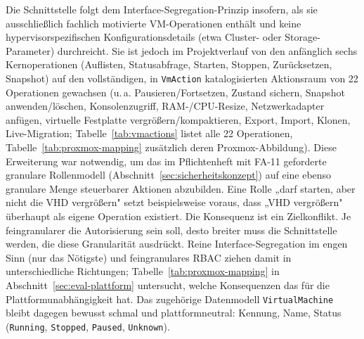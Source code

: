 \documentclass[12pt,a4paper]{article}
\begin{document}
Die Schnittstelle folgt dem Interface-Segregation-Prinzip insofern, als sie ausschließlich fachlich motivierte VM-Operationen enthält und keine hypervisorspezifischen Konfigurationsdetails (etwa Cluster- oder Storage-Parameter) durchreicht. Sie ist jedoch im Projektverlauf von den anfänglich sechs Kernoperationen (Auflisten, Statusabfrage, Starten, Stoppen, Zurücksetzen, Snapshot) auf den vollständigen, in \texttt{VmAction} katalogisierten Aktionsraum von 22 Operationen gewachsen (u.\,a. Pausieren/Fortsetzen, Zustand sichern, Snapshot anwenden/löschen, Konsolenzugriff, RAM-/CPU-Resize, Netzwerkadapter anfügen, virtuelle Festplatte vergrößern/kompaktieren, Export, Import, Klonen, Live-Migration; Tabelle~\ref{tab:vmactions} listet alle 22 Operationen, Tabelle~\ref{tab:proxmox-mapping} zusätzlich deren Proxmox-Abbildung). Diese Erweiterung war notwendig, um das im Pflichtenheft mit FA-11 geforderte granulare Rollenmodell (Abschnitt~\ref{sec:sicherheitskonzept}) auf eine ebenso granulare Menge steuerbarer Aktionen abzubilden. Eine Rolle „darf starten, aber nicht die VHD vergrößern" setzt beispielsweise voraus, dass „VHD vergrößern" überhaupt als eigene Operation existiert. Die Konsequenz ist ein Zielkonflikt. Je feingranularer die Autorisierung sein soll, desto breiter muss die Schnittstelle werden, die diese Granularität ausdrückt. Reine Interface-Segregation im engen Sinn (\glqq nur das Nötigste\grqq) und feingranulares RBAC ziehen damit in unterschiedliche Richtungen; Tabelle~\ref{tab:proxmox-mapping} in Abschnitt~\ref{sec:eval-plattform} untersucht, welche Konsequenzen das für die Plattformunabhängigkeit hat. Das zugehörige Datenmodell \texttt{VirtualMachine} bleibt dagegen bewusst schmal und plattformneutral: Kennung, Name, Status (\texttt{Running}, \texttt{Stopped}, \texttt{Paused}, \texttt{Unknown}).
\end{document}
